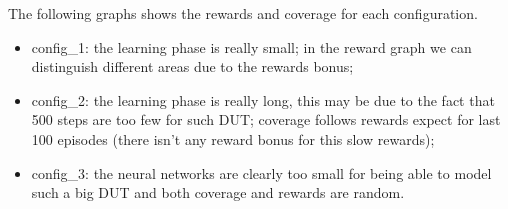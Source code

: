\documentclass{article}
\begin{document}
The following graphs shows the rewards and coverage for each configuration.
\begin{itemize}
\item config\_1: the learning phase is really small; in the reward graph we can distinguish different areas due to the rewards bonus;
\item config\_2: the learning phase is really long, this may be due to the fact that 500 steps are too few for such DUT; coverage follows rewards expect for last 100 episodes (there isn't any reward bonus for this slow rewards);
\item config\_3: the neural networks are clearly too small for being able to model such a big DUT and both coverage and rewards are random.
\end{itemize}

\begin{center}
\end{center}

\begin{center}
\end{center}

\begin{center}
\end{center}

\begin{center}
\end{center}
\end{document}
